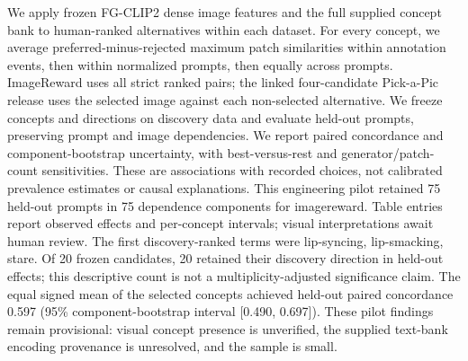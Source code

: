 We apply frozen FG-CLIP2 dense image features and the full supplied concept bank to human-ranked alternatives within each dataset. For every concept, we average preferred-minus-rejected maximum patch similarities within annotation events, then within normalized prompts, then equally across prompts. ImageReward uses all strict ranked pairs; the linked four-candidate Pick-a-Pic release uses the selected image against each non-selected alternative. We freeze concepts and directions on discovery data and evaluate held-out prompts, preserving prompt and image dependencies. We report paired concordance and component-bootstrap uncertainty, with best-versus-rest and generator/patch-count sensitivities. These are associations with recorded choices, not calibrated prevalence estimates or causal explanations. This engineering pilot retained 75 held-out prompts in 75 dependence components for imagereward. Table entries report observed effects and per-concept intervals; visual interpretations await human review.
The first discovery-ranked terms were lip-syncing, lip-smacking, stare. Of 20 frozen candidates, 20 retained their discovery direction in held-out effects; this descriptive count is not a multiplicity-adjusted significance claim. The equal signed mean of the selected concepts achieved held-out paired concordance 0.597 (95\% component-bootstrap interval [0.490, 0.697]). These pilot findings remain provisional: visual concept presence is unverified, the supplied text-bank encoding provenance is unresolved, and the sample is small.
